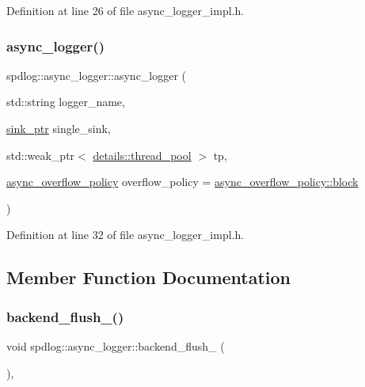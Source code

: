 Definition at line 26 of file async\+\_\+logger\+\_\+impl.\+h.

\mbox{\label{classspdlog_1_1async__logger_a99dcf454b74db04fe3300c68baff4d79}} 
\subsubsection{\texorpdfstring{async\+\_\+logger()}{async\_logger()}\hspace{0.1cm}{\footnotesize\ttfamily [3/3]}}
{\footnotesize\ttfamily spdlog\+::async\+\_\+logger\+::async\+\_\+logger (\begin{DoxyParamCaption}\item[{std\+::string}]{logger\+\_\+name,  }\item[{\hyperlink{namespacespdlog_a422c57d3088160b517e5a74e5f318253}{sink\+\_\+ptr}}]{single\+\_\+sink,  }\item[{std\+::weak\+\_\+ptr$<$ \hyperlink{classspdlog_1_1details_1_1thread__pool}{details\+::thread\+\_\+pool} $>$}]{tp,  }\item[{\hyperlink{namespacespdlog_a42e109759a11c9514d3f6313a7709852}{async\+\_\+overflow\+\_\+policy}}]{overflow\+\_\+policy = {\ttfamily \hyperlink{namespacespdlog_a42e109759a11c9514d3f6313a7709852a14511f2f5564650d129ca7cabc333278}{async\+\_\+overflow\+\_\+policy\+::block}} }\end{DoxyParamCaption})\hspace{0.3cm}{\ttfamily [inline]}}



Definition at line 32 of file async\+\_\+logger\+\_\+impl.\+h.



\subsection{Member Function Documentation}
\mbox{\label{classspdlog_1_1async__logger_a24a37552c3339c7b129a38a2c4702689}} 
\subsubsection{\texorpdfstring{backend\+\_\+flush\+\_\+()}{backend\_flush\_()}}
{\footnotesize\ttfamily void spdlog\+::async\+\_\+logger\+::backend\+\_\+flush\+\_\+ (\begin{DoxyParamCaption}{ }\end{DoxyParamCaption})\hspace{0.3cm}{\ttfamily [inline]}, {\ttfamily [protected]}}



